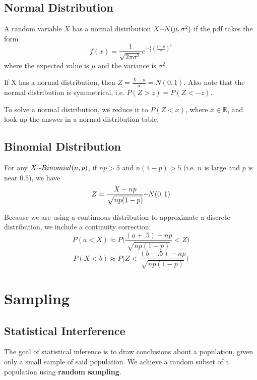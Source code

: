\documentclass[12pt]{article}
\begin{document}
\subsection*{Normal Distribution}
A random variable $X$ has a normal distribution $X \ttilde N(\mu, \sigma^2)$ if the pdf takes the form \[ f(x) = \frac{1}{\sqrt{2\pi\sigma^2}}e^{-\frac{1}{2}(\frac{x-\mu}{\sigma})^2} \] where the expected value is $\mu$ and the variance is $\sigma^2$.

If X has a normal distribution, then $Z = \frac{X - \mu}{\sigma} = N(0,1)$. Also note that the normal distribution is symmetrical, i.e. $P(Z > z) = P(Z < -z)$.

To solve a normal distribution, we reduce it to $P(Z < x)$, where $x \in \mathbb{R}$, and look up the answer in a normal distribution table.

\subsection*{Binomial Distribution}
For any $X \ttilde Binomial(n,p)$, if $np > 5$ and $n(1-p) > 5$ (i.e. $n$ is large and $p$ is near $0.5$), we have \[ Z = \frac{X - np}{\sqrt{np(1-p)}} \ttilde N(0,1) \]

Because we are using a continuous distribution to approximate a discrete distribution, we include a continuity correction: \[ P(a < X) \approx P\bigg(\frac{(a + .5) - np}{\sqrt{np(1-p)}} < Z\bigg) \] \[ P(X < b) \approx P\bigg(Z < \frac{(b - .5) - np}{\sqrt{np(1-p)}}\bigg) \]

\section*{Sampling}
\subsection*{Statistical Interference}
The goal of statistical inference is to draw conclusions about a population, given only a small sample of said population. We achieve a random subset of a population using {\bf random sampling}.
\end{document}
